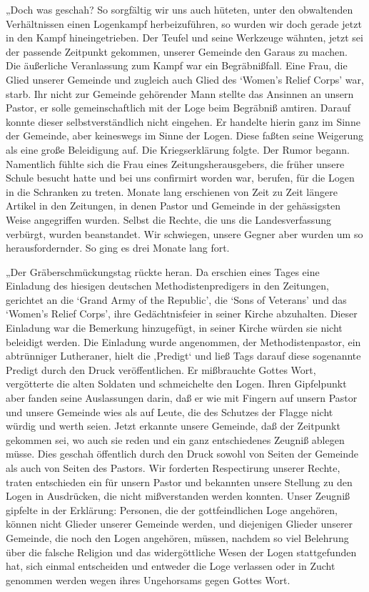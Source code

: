 „Doch was geschah? So sorgfältig wir uns auch hüteten, unter den obwaltenden Verhältnissen einen Logenkampf herbeizuführen, so wurden wir doch gerade jetzt in den Kampf hineingetrieben. Der Teufel und seine Werkzeuge wähnten, jetzt sei der passende Zeitpunkt gekommen, unserer Gemeinde den Garaus zu machen. Die äußerliche Veranlassung zum Kampf war ein Begräbnißfall. Eine Frau, die Glied unserer Gemeinde und zugleich auch Glied des ‘Women’s Relief Corps’ war, starb. Ihr nicht zur Gemeinde gehörender Mann stellte das Ansinnen an unsern Pastor, er solle gemeinschaftlich mit der Loge beim Begräbniß amtiren. Darauf konnte dieser selbstverständlich nicht eingehen. Er handelte hierin ganz im Sinne der Gemeinde, aber keineswegs im Sinne der Logen. Diese faßten seine Weigerung als eine große Beleidigung auf. Die Kriegserklärung folgte. Der Rumor begann. Namentlich fühlte sich die Frau eines Zeitungsherausgebers, die früher unsere Schule besucht hatte und bei uns confirmirt worden war, berufen, für die Logen in die Schranken zu treten. Monate lang erschienen von Zeit zu Zeit längere Artikel in den Zeitungen, in denen Pastor und Gemeinde in der gehässigsten Weise angegriffen wurden. Selbst die Rechte, die uns die Landesverfassung verbürgt, wurden beanstandet. Wir schwiegen, unsere Gegner aber wurden um so herausfordernder. So ging es drei Monate lang fort.

„Der Gräberschmückungstag rückte heran. Da erschien eines Tages eine Einladung des hiesigen deutschen Methodistenpredigers in den Zeitungen, gerichtet an die ‘Grand Army of the Republic’, die ‘Sons of Veterans’ und das ‘Women’s Relief Corps’, ihre Gedächtnisfeier in seiner Kirche abzuhalten. Dieser Einladung war die Bemerkung hinzugefügt, in seiner Kirche würden sie nicht beleidigt werden. Die Einladung wurde angenommen, der Methodistenpastor, ein abtrünniger Lutheraner, hielt die ‚Predigt‘ und ließ Tags darauf diese sogenannte Predigt durch den Druck veröffentlichen. Er mißbrauchte Gottes Wort, vergötterte die alten Soldaten und schmeichelte den Logen. Ihren Gipfelpunkt aber fanden seine Auslassungen darin, daß er wie mit Fingern auf unsern Pastor und unsere Gemeinde wies als auf Leute, die des Schutzes der Flagge nicht würdig und werth seien. Jetzt erkannte unsere Gemeinde, daß der Zeitpunkt gekommen sei, wo auch sie reden und ein ganz entschiedenes Zeugniß ablegen müsse. Dies geschah öffentlich durch den Druck sowohl von Seiten der Gemeinde als auch von Seiten des Pastors. Wir forderten Respectirung unserer Rechte, traten entschieden ein für unsern Pastor und bekannten unsere Stellung zu den Logen in Ausdrücken, die nicht mißverstanden werden konnten. Unser Zeugniß gipfelte in der Erklärung: Personen, die der gottfeindlichen Loge angehören, können nicht Glieder unserer Gemeinde werden, und diejenigen Glieder unserer Gemeinde, die noch den Logen angehören, müssen, nachdem so viel Belehrung über die falsche Religion und das widergöttliche Wesen der Logen stattgefunden hat, sich einmal entscheiden und entweder die Loge verlassen oder in Zucht genommen werden wegen ihres Ungehorsams gegen Gottes Wort.

